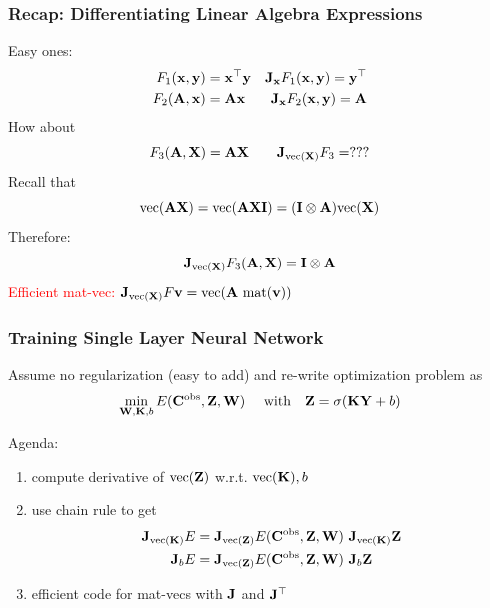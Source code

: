\documentclass[12pt,fleqn,handout]{beamer}
\begin{document}
\begin{frame}[fragile]\frametitle{Recap: Differentiating Linear Algebra Expressions}

Easy ones:
\begin{align*}
 F_1({\bf x},{\bf y}) &= {\bf x}^{\top} {\bf y}  & {\bf J}_{{\bf x}}F_1({\bf x},{\bf y}) = {\bf y}^\top\\
F_2({\bf A},{\bf x})  &= {\bf A} {\bf x}         & {\bf J}_{{\bf x}}F_2({\bf x},{\bf y}) = {\bf A} 
\end{align*}
\pause
How about
$$ F_3({\bf A},{\bf X}) =   {\bf A}  {\bf X} \quad \quad {\bf J}_{{\rm vec}({\bf X})}F_3 = ??? $$
\pause
Recall that
$${\rm vec}({\bf A} {\bf X}) = {\rm vec}({\bf A}  {\bf X} {\bf I}) = ({\bf I} \otimes {\bf A}) {\rm vec} ({\bf X}) $$
Therefore:
$$ {\bf J}_{{\rm vec}({\bf X})}F_3({\bf A},{\bf X}) = {\bf I} \otimes {\bf A} $$
\pause
\textcolor{red}{
Efficient mat-vec: } ${\bf J}_{{\rm vec}({\bf X})}F {\bf v} = {\rm vec} ( { {\bf A}\ \rm mat}({\bf v}) )$
	
\end{frame}


\begin{frame}[fragile]\frametitle{Training Single Layer Neural Network}

Assume no regularization (easy to add) and re-write optimization problem as 
\begin{eqnarray*}
 \min_{{\bf W},{\bf K},b}  E({\bf C}^{\rm obs}, {\bf Z},{\bf W} ) \quad \text{ with} \quad {\bf Z} = \sigma({\bf K}{\bf Y} + b)
\end{eqnarray*}

\bigskip
\pause

Agenda:
\begin{enumerate}
	\item compute derivative of ${\rm vec}({\bf Z})$ w.r.t. ${\rm vec}({\bf K}), b$ 
	\item use chain rule to get
	\begin{align*}
		{\bf J}_{{\rm vec}({\bf K})} E  & = {\bf J}_{{\rm vec}({\bf Z})} E({\bf C}^{\rm obs},{\bf Z},{\bf W}) \ {\bf J}_{{\rm vec}({\bf K})} {\bf Z}\\
		{\bf J}_{b} E  & = {\bf J}_{{\rm vec}({\bf Z})} E({\bf C}^{\rm obs},{\bf Z},{\bf W}) \ {\bf J}_{b} {\bf Z}
	\end{align*}
	\item efficient code for mat-vecs with ${\bf J}$ and ${\bf J}^\top$
\end{enumerate} 
\end{frame}
\end{document}
